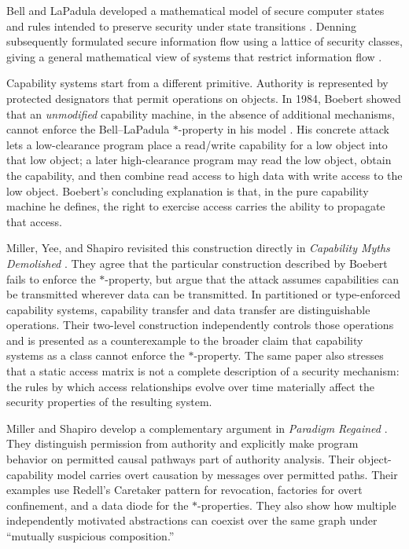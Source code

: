 \documentclass[10pt,twocolumn]{article}
\begin{document}
Bell and LaPadula developed a mathematical model of secure computer states and
rules intended to preserve security under state transitions
\cite{bell_lapadula1973,bell_lapadula1973model}.  Denning subsequently formulated secure information
flow using a lattice of security classes, giving a general mathematical view of
systems that restrict information flow \cite{denning1976}.

Capability systems start from a different primitive. Authority is represented
by protected designators that permit operations on objects. In 1984, Boebert
showed that an \emph{unmodified} capability machine, in the absence of
additional mechanisms, cannot enforce the Bell--LaPadula $*$-property in his
model \cite{boebert1984}. His concrete attack lets a low-clearance program place
a read/write capability for a low object into that low object; a later
high-clearance program may read the low object, obtain the capability, and then
combine read access to high data with write access to the low object.  Boebert's
concluding explanation is that, in the pure capability machine he defines, the
right to exercise access carries the ability to propagate that access.

Miller, Yee, and Shapiro revisited this construction directly in
\emph{Capability Myths Demolished} \cite{miller_yee_shapiro2003}.  They agree
that the particular construction described by Boebert fails to enforce the
$*$-property, but argue that the attack assumes capabilities can be transmitted
wherever data can be transmitted.  In partitioned or type-enforced capability
systems, capability transfer and data transfer are distinguishable operations.
Their two-level construction independently controls those operations and is
presented as a counterexample to the broader claim that capability systems as a
class cannot enforce the $*$-property.  The same paper also stresses that a
static access matrix is not a complete description of a security mechanism:
the rules by which access relationships evolve over time materially affect the
security properties of the resulting system.

Miller and Shapiro develop a complementary argument in \emph{Paradigm
Regained} \cite{miller_shapiro2003}.  They distinguish permission from
authority and explicitly make program behavior on permitted causal pathways
part of authority analysis.  Their object-capability model carries overt
causation by messages over permitted paths.  Their examples use Redell's
Caretaker pattern for revocation, factories for overt confinement, and a data
diode for the $*$-properties.  They also
show how multiple independently motivated abstractions can coexist over the
same graph under ``mutually suspicious composition.''
\end{document}
